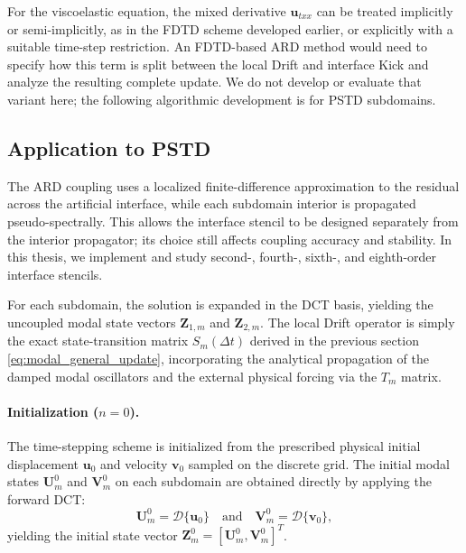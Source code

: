 \documentclass{Configuration_Files/PoliMi3i_thesis}
\newif\ifshowthesischanges
\DeclareRobustCommand{\thesischange}[2]{%
    \ifshowthesischanges
        \textcolor{#1}{#2}%
    \else
        #2%
    \fi
}
\def\thesischange#1#2{#2}%
\begin{document}
For the viscoelastic equation, the mixed derivative $\mathbf u_{txx}$ can be treated implicitly or semi-implicitly, as in the FDTD scheme developed earlier, or explicitly with a suitable time-step restriction. An FDTD-based ARD method would need to specify how this term is split between the local Drift and interface Kick and analyze the resulting complete update. We do not develop or evaluate that variant here; the following algorithmic development is for PSTD subdomains.

\subsection{Application to PSTD}
\label{sec:pstd_multi_subdomain}

The ARD coupling uses a localized finite-difference approximation to the residual across the artificial interface, while each subdomain interior is propagated pseudo-spectrally. This allows the interface stencil to be designed separately from the interior propagator; its choice still affects coupling accuracy and stability. In this thesis, we implement and study second-, fourth-, sixth-, and eighth-order interface stencils.

For each subdomain, the solution is expanded in the DCT basis, yielding the uncoupled modal state vectors $\mathbf Z_{1,m}$ and $\mathbf Z_{2,m}$. The local Drift operator is simply the exact state-transition matrix $S_m(\Delta t)$ derived in the previous section \eqref{eq:modal_general_update}, incorporating the analytical propagation of the damped modal oscillators and the external physical forcing via the $T_m$ matrix.

\thesischange{red}{
\paragraph{Initialization ($n=0$).}
The time-stepping scheme is initialized from the prescribed physical initial displacement $\mathbf{u}_0$ and velocity $\mathbf{v}_0$ sampled on the discrete grid. The initial modal states $\mathbf{U}_m^0$ and $\mathbf{V}_m^0$ on each subdomain are obtained directly by applying the forward DCT:
\begin{equation*}
    \mathbf{U}_m^0 = \mathcal{D} \{ \mathbf{u}_0 \} \quad \text{and} \quad \mathbf{V}_m^0 = \mathcal{D} \{ \mathbf{v}_0 \},
\end{equation*}
yielding the initial state vector $\mathbf{Z}_m^0 = [\mathbf{U}_m^0, \mathbf{V}_m^0]^T$.}
\end{document}
